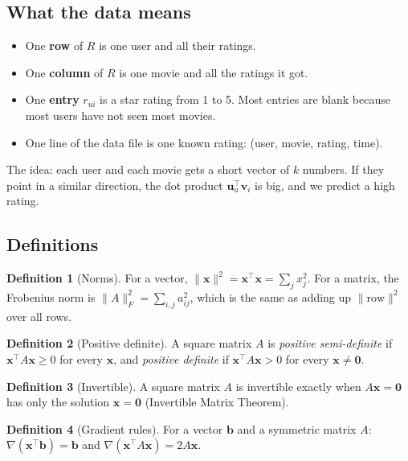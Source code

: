 \documentclass[11pt]{article}
\theoremstyle{definition}
\newtheorem{definition}{Definition}
\begin{document}
\subsection{What the data means}
\begin{itemize}[nosep]
\item One \textbf{row} of $R$ is one user and all their ratings.
\item One \textbf{column} of $R$ is one movie and all the ratings it got.
\item One \textbf{entry} $r_{ui}$ is a star rating from 1 to 5. Most entries are blank because most users have not seen most movies.
\item One line of the data file is one known rating: (user, movie, rating, time).
\end{itemize}
The idea: each user and each movie gets a short vector of $k$ numbers. If they point in a similar direction, the dot product $\mathbf u_u^\top\mathbf v_i$ is big, and we predict a high rating.

\subsection{Definitions}
\begin{definition}[Norms]
For a vector, $\|\mathbf x\|^2=\mathbf x^\top\mathbf x=\sum_j x_j^2$. For a matrix, the Frobenius norm is $\|A\|_F^2=\sum_{i,j}a_{ij}^2$, which is the same as adding up $\|\text{row}\|^2$ over all rows.
\end{definition}

\begin{definition}[Positive definite]
A square matrix $A$ is \emph{positive semi-definite} if $\mathbf x^\top A\mathbf x\ge0$ for every $\mathbf x$, and \emph{positive definite} if $\mathbf x^\top A\mathbf x>0$ for every $\mathbf x\neq\mathbf 0$.
\end{definition}

\begin{definition}[Invertible]
A square matrix $A$ is invertible exactly when $A\mathbf x=\mathbf 0$ has only the solution $\mathbf x=\mathbf 0$ (Invertible Matrix Theorem).
\end{definition}

\begin{definition}[Gradient rules]
For a vector $\mathbf b$ and a symmetric matrix $A$:
$\nabla(\mathbf x^\top\mathbf b)=\mathbf b$ and $\nabla(\mathbf x^\top A\mathbf x)=2A\mathbf x$.
\end{definition}
\end{document}
